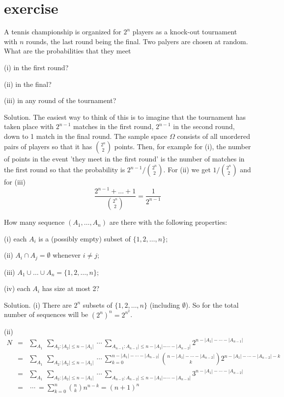 



\section{exercise}

\ben



\item A tennis championship is organized for $2^n$ players as a knock-out tournament with $n$ rounds, the last round being the final. Two palyers are chosen at random. What are the probabilities that they meet 

(i) in the first round?

(ii) in the final?

(iii) in any round of the tournament?



Solution. The easiest way to think of this is to imagine that the tournament has taken place with $2^{n-1}$ matches in the first round, $2^{n-1}$ in the second round, down to 1 match in the final round. The sample space $\Omega$ consists of all unordered pairs of players so that it has $\binom{2^n}{2}$ points. Then, for example for (i), the number of points in the event 'they meet in the first round' is the number of matches in the first round so that the probability is $2^{n-1}/\binom{2^n}{2}$. For (ii) we get $1/\binom{2^n}{2}$ and for (iii) 
\begin{equation}
\frac{2^{n-1}+\dots+1}{\binom{2^n}{2}}=\frac{1}{2^{n-1}}
\end{equation}


\item How many sequence $(A_1,\dots,A_n)$ are there with the following properties:

(i) each $A_i$ is a (possibly empty) subset of $\{1,2,\dots,n\}$;

(ii) $A_i\cap A_j=\emptyset$ whenever $i\neq j$;

(iii)  $A_1\cup\dots\cup A_n=\{1,2,\dots,n\}$;

(iv) each $A_i$ has size at most 2?



Solution. (i) There are $2^n$ subsets of $\{1,2,\dots,n\}$ (including $\emptyset$). So for the total number of sequences will be $\left(2^n\right)^n=2^{n^2}$.

(ii) 
\begin{eqnarray}
N & = & \sum_{A_1}\ \sum_{A_2:|A_2|\leq n-|A_1|}\ \cdots\ \sum_{A_{n-1}:A_{n-1}|\leq n-|A_1|-\cdots-|A_{n-2}|}2^{n-|A_1|-\cdots-|A_{n-1}|} \nonumber\\
& = & \sum_{A_1}\ \sum_{A_2:|A_2|\leq n-|A_1|}\ \cdots\ \sum_{k=0}^{n-|A_1|-\cdots-|A_{n-2}|} \binom{n-|A_1|-\cdots-|A_{n-2}|}{k}2^{n-|A_1|-\cdots-|A_{n-2}|-k} \nonumber\\
& = & \sum_{A_1}\ \sum_{A_2:|A_2|\leq n-|A_1|}\ \cdots\ \sum_{A_{n-2}:A_{n-2}|\leq n-|A_1|-\cdots-|A_{n-3}|}3^{n-|A_1|-\cdots-|A_{n-2}|} \nonumber\\
& = & \ \cdots \ = \sum^n_{k=0}\binom{n}{k}n^{n-k} = (n+1)^n
\end{eqnarray}	


